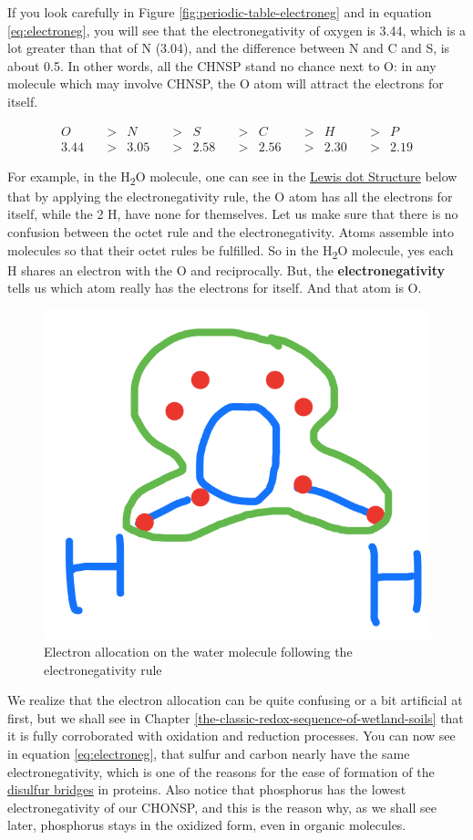 \documentclass[]{book}
\theoremstyle{definition}
\theoremstyle{definition}
\theoremstyle{definition}
\theoremstyle{remark}
\begin{document}
If you look carefully in Figure \ref{fig:periodic-table-electroneg} and
in equation \eqref{eq:electroneg}, you will see that the electronegativity
of oxygen is 3.44, which is a lot greater than that of N (3.04), and the
difference between N and C and S, is about 0.5. In other words, all the
CHNSP stand no chance next to O: in any molecule which may involve
CHNSP, the O atom will attract the electrons for itself.

\begin{align}
O  \quad &>&   N  \quad &>& S \quad &>&  C \quad &>& H  \quad &>& P \\
3.44 \quad &>& 3.05  \quad &>& 2.58 \quad &>& 2.56 \quad &>& 2.30 \quad &>& 2.19
\label{eq:electroneg}
\end{align}

For example, in the H\textsubscript{2}O molecule, one can see in the
\protect\hyperlink{Lewis-structure}{Lewis dot Structure} below that by
applying the electronegativity rule, the O atom has all the electrons
for itself, while the 2 H, have none for themselves. Let us make sure
that there is no confusion between the octet rule and the
electronegativity. Atoms assemble into molecules so that their octet
rules be fulfilled. So in the H\textsubscript{2}O molecule, yes each H
shares an electron with the O and reciprocally. But, the
\textbf{electronegativity} tells us which atom really has the electrons
for itself. And that atom is O.

\begin{figure}

{\centering \includegraphics[width=0.25\linewidth]{pictures/ElecAlloc_H2O} 

}

\caption{Electron allocation on the water molecule following the electronegativity rule}\label{fig:elecalloc-H2O}
\end{figure}

We realize that the electron allocation can be quite confusing or a bit
artificial at first, but we shall see in Chapter
\ref{the-classic-redox-sequence-of-wetland-soils} that it is fully
corroborated with oxidation and reduction processes. You can now see in
equation \eqref{eq:electroneg}, that sulfur and carbon nearly have the
same electronegativity, which is one of the reasons for the ease of
formation of the \protect\hyperlink{disulfur-bridges}{disulfur bridges}
in proteins. Also notice that phosphorus has the lowest
electronegativity of our CHONSP, and this is the reason why, as we shall
see later, phosphorus stays in the oxidized form, even in organic
molecules.
\end{document}
